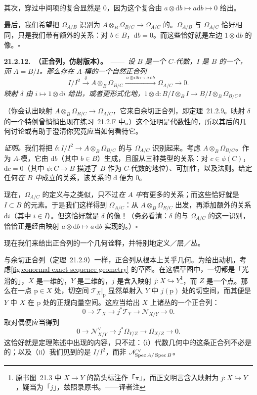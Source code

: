 其次，穿过中间项的复合显然是 $0$，因为这个复合由 $a\otimes\mathrm{d}b\mapsto a\mathrm{d}b\mapsto 0$ 给出。

最后，我们希望把 $\Omega_{A/B}$ 识别为 $A\otimes_B\Omega_{B/C}\to\Omega_{A/C}$ 的\trCokernel。$\Omega_{A/B}$ 与 $\Omega_{A/C}$ 恰好相同，只是我们带有额外的关系：对 $b\in B$，$\mathrm{d}b=0$。而这些恰好就是左边 $1\otimes\mathrm{d}b$ 的像。\hfill$\square$

\textbf{21.2.12.\ \trhTheorem（\trConormal{}正合列，仿射版本）。}\ ——\ \emph{设 $B$ 是一个 $C$-代数，$I$ 是 $B$ 的一个\trIdeal，而 $A=B/I$。那么存在 $A$-模的一个自然正合列}
\[
I/I^2\xrightarrow{\ \delta\ }A\otimes_B\Omega_{B/C}\xrightarrow{\ a\otimes\mathrm{d}b\mapsto a\,\mathrm{d}b\ }\Omega_{A/C}\longrightarrow 0.
\]
\emph{映射 $\delta$ 由 $i\mapsto 1\otimes\mathrm{d}i$ 给出，或者更形式化地，$1\otimes\mathrm{d}\colon B/I\otimes_B I\to B/I\otimes_B\Omega_{B/C}$。}

（你会认出映射 $A\otimes_B\Omega_{B/C}\to\Omega_{A/C}$，它来自余切正合列，即\mbox{定理~21.2.9}。映射 $\delta$ 的一个特例曾悄悄出现在\mbox{练习~21.2.F} 中。）这个证明是代数性的，所以其后的几何讨论或有助于澄清你究竟应当如何看待它。

\emph{证明。}\quad 我们将把 $\delta\colon I/I^2\to A\otimes_B\Omega_{B/C}$ 的\trCokernel{}与 $\Omega_{A/C}$ 识别起来。考虑 $A\otimes_B\Omega_{B/C}$。作为 $A$-模，它由 $\mathrm{d}b$（其中 $b\in B$）生成，且服从三种类型的关系：对 $c\in\phi(C)$，$\mathrm{d}c=0$（其中 $\phi\colon C\to B$ 描述了 $B$ 作为 $C$-代数的地位）、可加性，以及\trLeibniz{}法则。给定任何\emph{在 $B$ 中}成立的关系，该关系的 $\mathrm{d}$ 便为 $0$。

现在，$\Omega_{A/C}$ 的定义与之类似，只不过\emph{在 $A$ 中}有更多的关系；而这些恰好就是 $I\subset B$ 的元素。于是我们这样得到 $\Omega_{A/C}$：从 $A\otimes_B\Omega_{B/C}$ 出发，再添加额外的关系 $\mathrm{d}i$（其中 $i\in I$）。但这恰好就是 $\delta$ 的像！（务必看清：$\delta$ 的\trCokernel{}与 $\Omega_{A/C}$ 的这一识别，恰恰正是经由映射 $a\otimes\mathrm{d}b\mapsto a\,\mathrm{d}b$ 实现的。）\hfill$\square$

现在我们来给出\trConormal{}正合列的一个几何诠释，并特别地定义\trConormalSheaf／\trConormal{}层／\trConormal{}丛。

与余切正合列（\mbox{定理~21.2.9}）一样，\trConormal{}正合列从根本上关乎几何。为给出动机，考虑\cref{fig:conormal-exact-sequence-geometry} 的草图。在这幅草图中，一切都是「光滑的」，$X$ 是一维的，$Y$ 是二维的，$j$ 是含入映射 $j\colon X\hookrightarrow Y$\footnote{原书图~21.3 中 $X\to Y$ 的箭头标注作「$\pi$」，而正文明言含入映射为 $j\colon X\hookrightarrow Y$，疑当为「$j$」，兹照录原书。——译者注}，而 $Z$ 是一个点。那么在一点 $\mathrm{p}\in X$ 处，切空间 $\mathscr{T}_X|_{\mathrm{p}}$ 显然单射入 $Y$ 中 $j(\mathrm{p})$ 处的切空间，而其\trCokernel{}便是 $Y$ 中 $X$ 在 $\mathrm{p}$ 处的正规向量空间。这应当给出 $X$ 上诸丛的一个正合列：
\[
0\longrightarrow\mathscr{T}_X\longrightarrow j^*\mathscr{T}_Y\longrightarrow\mathscr{N}_{X/Y}\longrightarrow 0.
\]
取对偶便应当得到
\[
0\longrightarrow\mathscr{N}_{X/Y}^{\vee}\longrightarrow j^*\Omega_{Y/Z}\longrightarrow\Omega_{X/Z}\longrightarrow 0.
\]
这恰好就是定理陈述中出现的内容，只不过：（i）代数几何中的这条正合列不必是\trLeftExact{}的；以及（ii）我们见到的是 $I/I^2$，而非 $\mathscr{N}^{\vee}_{\operatorname{Spec} A/\operatorname{Spec} B}$。

